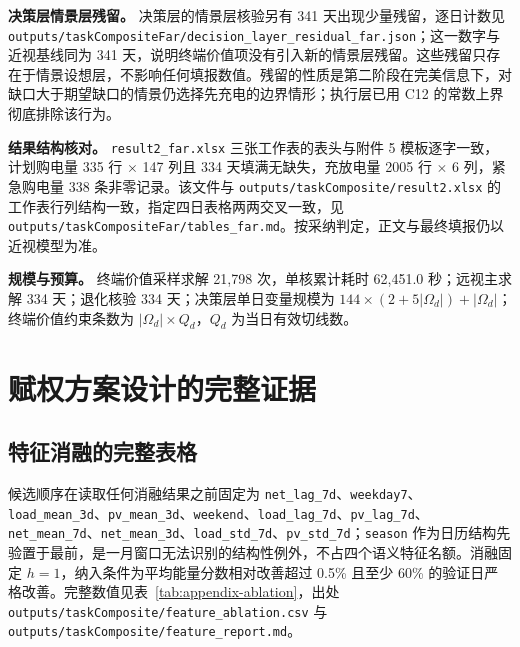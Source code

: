 \begin{appendices}
\textbf{决策层情景层残留。} 决策层的情景层核验另有 341 天出现少量残留，逐日计数见 \texttt{outputs/\allowbreak taskCompositeFar/\allowbreak decision\_layer\_residual\_far.json}；这一数字与近视基线同为 341 天，说明终端价值项没有引入新的情景层残留。这些残留只存在于情景设想层，不影响任何填报数值。残留的性质是第二阶段在完美信息下，对缺口大于期望缺口的情景仍选择先充电的边界情形；执行层已用 C12 的常数上界彻底排除该行为。

\textbf{结果结构核对。} \texttt{result2\_far.xlsx} 三张工作表的表头与附件 5 模板逐字一致，计划购电量 335 行 $\times$ 147 列且 334 天填满无缺失，充放电量 2005 行 $\times$ 6 列，紧急购电量 338 条非零记录。该文件与 \texttt{outputs/\allowbreak taskComposite/\allowbreak result2.xlsx} 的工作表行列结构一致，指定四日表格两两交叉一致，见 \texttt{outputs/\allowbreak taskCompositeFar/\allowbreak tables\_far.md}。按采纳判定，正文与最终填报仍以近视模型为准。

\textbf{规模与预算。} 终端价值采样求解 21,798 次，单核累计耗时 62,451.0 秒；远视主求解 334 天；退化核验 334 天；决策层单日变量规模为 $144\times(2+5\lvert\Omega_d\rvert)+\lvert\Omega_d\rvert$；终端价值约束条数为 $\lvert\Omega_d\rvert\times Q_d$，$Q_d$ 为当日有效切线数。

\section{赋权方案设计的完整证据}

\subsection{特征消融的完整表格}

候选顺序在读取任何消融结果之前固定为 \texttt{net\_lag\_7d}、\texttt{weekday7}、\texttt{load\_mean\_3d}、\texttt{pv\_mean\_3d}、\texttt{weekend}、\texttt{load\_lag\_7d}、\texttt{pv\_lag\_7d}、\texttt{net\_mean\_7d}、\texttt{net\_mean\_3d}、\texttt{load\_std\_7d}、\texttt{pv\_std\_7d}；\texttt{season} 作为日历结构先验置于最前，是一月窗口无法识别的结构性例外，不占四个语义特征名额。消融固定 $h=1$，纳入条件为平均能量分数相对改善超过 0.5\% 且至少 60\% 的验证日严格改善。完整数值见表~\ref{tab:appendix-ablation}，出处 \texttt{outputs/\allowbreak taskComposite/\allowbreak feature\_ablation.csv} 与 \texttt{outputs/\allowbreak taskComposite/\allowbreak feature\_report.md}。


\end{appendices}
